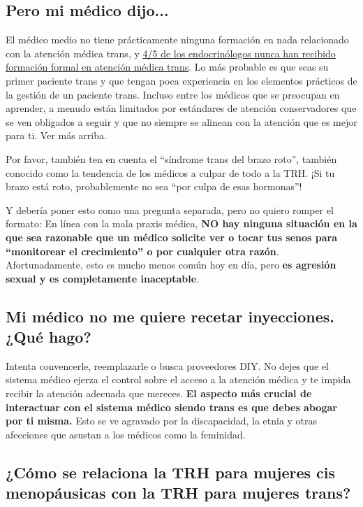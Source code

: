 \documentclass{article}
\begin{document}
\subsection{Pero mi médico dijo...}

El médico medio no tiene prácticamente ninguna formación en nada relacionado con la atención médica trans, y \href{https://www.endocrine.org/news-and-advocacy/news-room/2017/endocrinologists-want-training-in-transgender-care}{4/5 de los endocrinólogos nunca han recibido formación formal en atención médica trans}. Lo más probable es que seas su primer paciente trans y que tengan poca experiencia en los elementos prácticos de la gestión de un paciente trans. Incluso entre los médicos que se preocupan en aprender, a menudo están limitados por estándares de atención conservadores que se ven obligados a seguir y que no siempre se alinean con la atención que es mejor para ti. Ver más arriba.

Por favor, también ten en cuenta el “síndrome trans del brazo roto”, también conocido como la tendencia de los médicos a culpar de todo a la TRH. ¡Si tu brazo está roto, probablemente no sea “por culpa de esas hormonas”!

Y debería poner esto como una pregunta separada, pero no quiero romper el formato: En línea con la mala praxis médica, \textbf{NO hay ninguna situación en la que sea razonable que un médico solicite ver o tocar tus senos para “monitorear el crecimiento” o por cualquier otra razón}. Afortunadamente, esto es mucho menos común hoy en día, pero \textbf{es agresión sexual y es completamente inaceptable}.

\subsection{Mi médico no me quiere recetar inyecciones. ¿Qué hago?}

Intenta convencerle, reemplazarle o busca proveedores DIY. No dejes que el sistema médico ejerza el control sobre el acceso a la atención médica y te impida recibir la atención adecuada que mereces. \textbf{El aspecto más crucial de interactuar con el sistema médico siendo trans es que debes abogar por ti misma.} Esto se ve agravado por la discapacidad, la etnia y otras afecciones que asustan a los médicos como la feminidad.

\subsection{¿Cómo se relaciona la TRH para mujeres cis menopáusicas con la TRH para mujeres trans?}\label{11-29}
\end{document}
